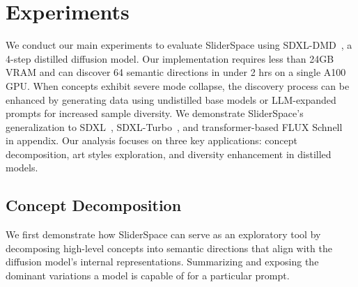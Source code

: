 \section{Experiments}
We conduct our main experiments to evaluate SliderSpace using SDXL-DMD~\cite{dmd}, a 4-step distilled diffusion model. Our implementation requires less than 24GB VRAM and can discover 64 semantic directions in under 2 hrs on a single A100 GPU. When concepts exhibit severe mode collapse, the discovery process can be enhanced by generating data using undistilled base models or LLM-expanded prompts for increased sample diversity. We demonstrate SliderSpace's generalization to SDXL~\cite{podell2023sdxl}, SDXL-Turbo~\cite{turbo}, and transformer-based FLUX Schnell~\cite{flux} in appendix. Our analysis focuses on three key applications: concept decomposition, art styles exploration, and diversity enhancement in distilled models.


\subsection{Concept Decomposition} \label{sec:concept_exp}
We first demonstrate how SliderSpace can serve as an exploratory tool by decomposing high-level concepts into semantic directions that align with the diffusion model's internal representations. Summarizing and exposing the dominant variations a model is capable of for a particular prompt.


